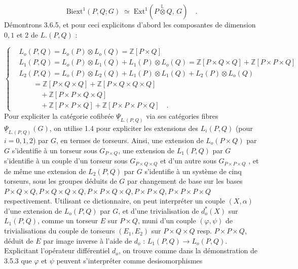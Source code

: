 \begin{equation}\tag{3.6.5.1}
\mathrm{Biext}^1(P,Q;G) \;\simeq\; \mathrm{Ext}^1(P \overset{\mathbb{L}}{\otimes} Q,\, G) \quad .
\end{equation}
Démontrons 3.6.5, et pour ceci explicitons d'abord les composantes de dimension $0,1$ et $2$ de $L.(P,Q)$ :

\begin{equation}\tag{3.6.6}
\left\{
\begin{aligned}
&L_o(P,Q) = L_o(P) \otimes L_o(Q) = \mathbb{Z}[P\times Q] \\
&L_1(P,Q) = L_o(P) \otimes L_1(Q) + L_1(P) \otimes L_o(Q) = \mathbb{Z}[P\times Q\times Q] + \mathbb{Z}[P\times P\times Q] \\
&L_2(P,Q) = L_o(P) \otimes L_2(Q) + L_1(P) \otimes L_1(Q) + L_2(P) \otimes L_o(Q) \\
&\qquad = \mathbb{Z}[P\times Q\times Q] + \mathbb{Z}[P\times Q\times Q\times Q] \\
&\qquad\quad + \mathbb{Z}[P\times P\times Q\times Q] \\
&\qquad\quad + \mathbb{Z}[P\times P\times Q] + \mathbb{Z}[P\times P\times P\times Q] \quad .
\end{aligned}
\right.
\end{equation}
Pour expliciter la catégorie cofibrée $\underline{\Psi}_{L.(P,Q)}$ via ses catégories fibres $\underline{\Psi}_{L.(P,Q)}(G)$, on utilise 1.4 pour expliciter les extensions des $L_i(P,Q)$ (pour $i=0,1,2$) par $G$, en termes de torseurs. Ainsi, une extension de $L_o(P\times Q)$ par $G$ s'identifie à un torseur sous $G_{P\times Q}$, une extension de $L_1(P,Q)$ par $G$ s'identifie à un couple d'un torseur sous $G_{P\times Q\times Q}$ et d'un autre sous $G_{P\times P\times Q}$ , et de même une extension de $L_2(P,Q)$ par $G$ s'identifie à un système de cinq torseurs, sous les groupes déduits de $G$ par changement de base sur les bases $P\times Q\times Q, P\times Q\times Q\times Q, P\times P\times Q\times Q, P\times P\times Q, P\times P\times P\times Q$ respectivement. Utilisant ce dictionnaire, on peut interpréter un couple $(X,\alpha)$ d'une extension de $L_o(P,Q)$ par $G$, et d'une trivialisation de $d_o^*(X)$ sur $L_1(P,Q)$, comme un torseur $E$ sur $P\times Q$, muni d'un couple $(\varphi,\psi)$ de trivialisations du couple de torseurs $(E_1,E_2)$ sur $P\times Q\times Q$ resp. $P\times P\times Q$, déduit de $E$ par image inverse
à l'aide de $d_o$ : $L_1(P,Q) \longrightarrow L_o(P,Q)$. Explicitant l'opérateur différentiel $d_o$, on trouve comme dans la démonstration de 3.5.3 que $\varphi$ et $\psi$ peuvent s'interpréter comme desisomorphismes

